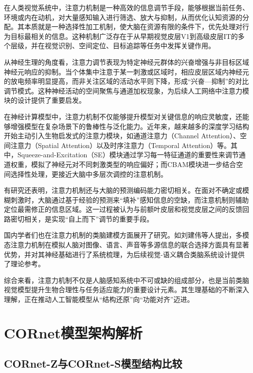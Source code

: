 在人类视觉系统中，注意力机制是一种高效的信息调节手段，能够根据当前任务、环境或内在动机，对大量感知输入进行筛选、放大与抑制，从而优化认知资源的分配。其本质就是一种选择性加工机制，使大脑在资源有限的条件下，优先处理对行为目标最相关的信息。这种机制广泛存在于从早期视觉皮层V1到高级皮层IT的多个层级，并在视觉识别、空间定位、目标追踪等任务中发挥关键作用。

从神经生理的角度看，注意力调节表现为特定神经元群体的兴奋增强与非目标区域神经元响应的抑制。当个体集中注意于某一刺激或区域时，相应皮层区域内神经元的放电频率明显提高，而非关注区域的活动水平则下降，形成“兴奋—抑制”的对比调节模式。这种神经活动的空间聚焦与通道加权现象，为后续人工网络中注意力模块的设计提供了重要启发\cite{carrasco2011visual}。

在神经计算模型中，注意力机制不仅能够提升模型对关键信息的响应灵敏度，还能够增强模型在复杂场景下的鲁棒性与泛化能力。近年来，越来越多的深度学习结构开始主动引入生物启发式的注意力模块，如通道注意力（Channel Attention）、空间注意力（Spatial Attention）以及时序注意力（Temporal Attention）等。其中，Squeeze-and-Excitation（SE）模块通过学习每一特征通道的重要性来调节通道权重，模拟了神经元对不同刺激类型的响应偏好\cite{hu2018squeeze}；而CBAM模块进一步结合空间选择性处理，更接近大脑中多层次调控的注意机制\cite{woo2018cbam}。

有研究还表明，注意力机制还与大脑的预测编码能力密切相关。在面对不确定或模糊刺激时，大脑通过基于经验的预测来“填补”感知信息的空缺，而注意机制则辅助定位最需修正的信息区域。这一过程被认为与前额叶皮层和视觉皮层之间的反馈回路密切相关，是实现“自上而下”调节的重要手段\cite{bastos2012canonical}。

国内学者们也在注意力机制的类脑建模方面展开了研究。如刘建伟等人提出，多模态注意力机制在模拟人脑对图像、语言、声音等多源信息的联合选择方面具有显著优势，并对其神经基础进行了系统梳理，为后续视觉-语义耦合类脑系统设计提供了理论参考\cite{刘建伟2020多模态深度学习综述}。

综合来看，注意力机制不仅是人脑感知系统中不可或缺的组成部分，也是当前类脑视觉模型提升生物合理性与任务适应能力的重要设计元素。其生理基础的不断深入理解，正在推动人工智能模型从“结构还原”向“功能对齐”迈进。


\section{CORnet模型架构解析}

\subsection{CORnet-Z与CORnet-S模型结构比较}


